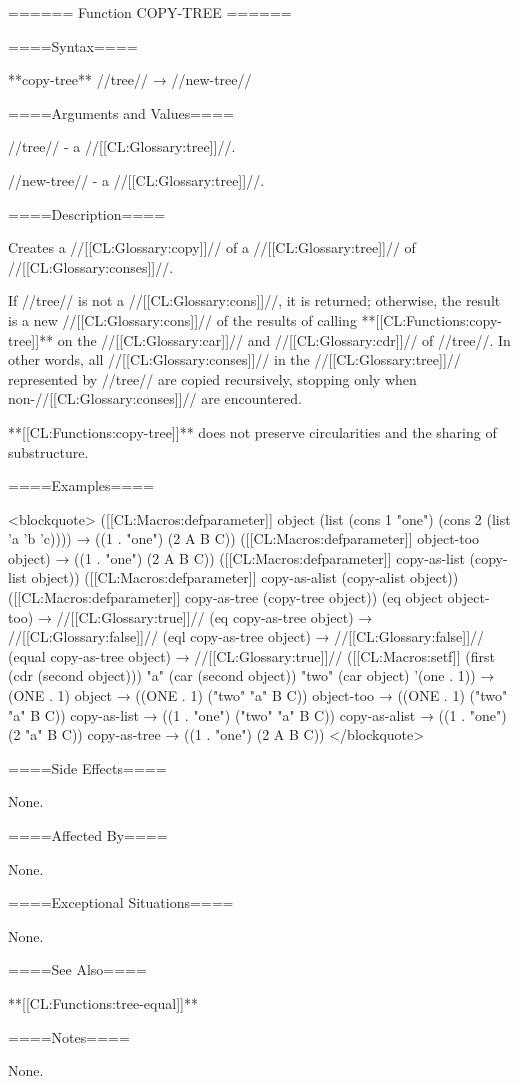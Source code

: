 ====== Function COPY-TREE ======

====Syntax====

**copy-tree** //tree// → //new-tree//

====Arguments and Values====

//tree// - a //[[CL:Glossary:tree]]//.

//new-tree// - a //[[CL:Glossary:tree]]//.

====Description====

Creates a //[[CL:Glossary:copy]]// of a //[[CL:Glossary:tree]]// of //[[CL:Glossary:conses]]//.

If //tree// is not a //[[CL:Glossary:cons]]//, it is returned; otherwise, the result is a new //[[CL:Glossary:cons]]// of the results of calling **[[CL:Functions:copy-tree]]** on the //[[CL:Glossary:car]]// and //[[CL:Glossary:cdr]]// of //tree//. In other words, all //[[CL:Glossary:conses]]// in the //[[CL:Glossary:tree]]// represented by //tree// are copied recursively, stopping only when non-//[[CL:Glossary:conses]]// are encountered.

**[[CL:Functions:copy-tree]]** does not preserve circularities and the sharing of substructure.

====Examples====

<blockquote> ([[CL:Macros:defparameter]] object (list (cons 1 "one") (cons 2 (list 'a 'b 'c)))) → ((1 . "one") (2 A B C)) ([[CL:Macros:defparameter]] object-too object) → ((1 . "one") (2 A B C)) ([[CL:Macros:defparameter]] copy-as-list (copy-list object)) ([[CL:Macros:defparameter]] copy-as-alist (copy-alist object)) ([[CL:Macros:defparameter]] copy-as-tree (copy-tree object)) (eq object object-too) → //[[CL:Glossary:true]]// (eq copy-as-tree object) → //[[CL:Glossary:false]]// (eql copy-as-tree object) → //[[CL:Glossary:false]]// (equal copy-as-tree object) → //[[CL:Glossary:true]]// ([[CL:Macros:setf]] (first (cdr (second object))) "a" (car (second object)) "two" (car object) '(one . 1)) → (ONE . 1) object → ((ONE . 1) ("two" "a" B C)) object-too → ((ONE . 1) ("two" "a" B C)) copy-as-list → ((1 . "one") ("two" "a" B C)) copy-as-alist → ((1 . "one") (2 "a" B C)) copy-as-tree → ((1 . "one") (2 A B C)) </blockquote>

====Side Effects====

None.

====Affected By====

None.

====Exceptional Situations====

None.

====See Also====

**[[CL:Functions:tree-equal]]**

====Notes====

None.

